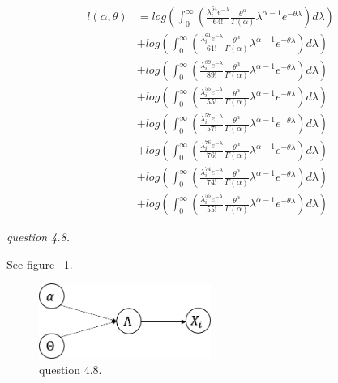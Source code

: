 \documentclass{article}
\begin{document}
\begin{align*}
    l(\alpha, \theta)&=log\left(\int_0^\infty\left(\frac{\lambda_i^{64}e^{-\lambda}}{64!}\frac{\theta^\alpha}{\Gamma(\alpha)}\lambda^{\alpha-1}e^{-\theta\lambda}\right)d\lambda\right)\\&+
    log\left(\int_0^\infty\left(\frac{\lambda_i^{61}e^{-\lambda}}{61!}\frac{\theta^\alpha}{\Gamma(\alpha)}\lambda^{\alpha-1}e^{-\theta\lambda}\right)d\lambda\right)\\&+
    log\left(\int_0^\infty\left(\frac{\lambda_i^{89}e^{-\lambda}}{89!}\frac{\theta^\alpha}{\Gamma(\alpha)}\lambda^{\alpha-1}e^{-\theta\lambda}\right)d\lambda\right)\\&+
    log\left(\int_0^\infty\left(\frac{\lambda_i^{55}e^{-\lambda}}{55!}\frac{\theta^\alpha}{\Gamma(\alpha)}\lambda^{\alpha-1}e^{-\theta\lambda}\right)d\lambda\right)\\&+
    log\left(\int_0^\infty\left(\frac{\lambda_i^{57}e^{-\lambda}}{57!}\frac{\theta^\alpha}{\Gamma(\alpha)}\lambda^{\alpha-1}e^{-\theta\lambda}\right)d\lambda\right)\\&+
    log\left(\int_0^\infty\left(\frac{\lambda_i^{76}e^{-\lambda}}{76!}\frac{\theta^\alpha}{\Gamma(\alpha)}\lambda^{\alpha-1}e^{-\theta\lambda}\right)d\lambda\right)\\&+
    log\left(\int_0^\infty\left(\frac{\lambda_i^{74}e^{-\lambda}}{74!}\frac{\theta^\alpha}{\Gamma(\alpha)}\lambda^{\alpha-1}e^{-\theta\lambda}\right)d\lambda\right)\\&+
    log\left(\int_0^\infty\left(\frac{\lambda_i^{55}e^{-\lambda}}{55!}\frac{\theta^\alpha}{\Gamma(\alpha)}\lambda^{\alpha-1}e^{-\theta\lambda}\right)d\lambda\right)
\end{align*}



\vspace{\baselineskip}
\textit{question 4.8.}

See figure ~\ref{fig:4-8}.

\begin{figure}[H]
    \centering
        \includegraphics[width=0.5\textwidth]{4-8}
    \caption{question 4.8.}
    \label{fig:4-8}
\end{figure}
\end{document}
